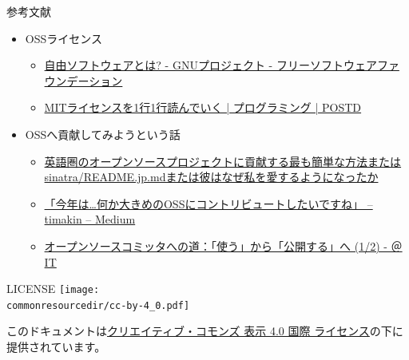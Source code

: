 \documentclass[
        unicode%
    ]{beamer}
\newcommand*\commonresourcedir{../../resources}
\begin{document}
\begin{frame}{参考文献}
    \begin{itemize}
        \item OSSライセンス
            \begin{itemize}
                \item \href{https://www.gnu.org/philosophy/free-sw.ja.html}{自由ソフトウェアとは? - GNUプロジェクト - フリーソフトウェアファウンデーション}
                \item \href{http://postd.cc/mit-license-line-by-line/}{MITライセンスを1行1行読んでいく | プログラミング | POSTD}
            \end{itemize}
        \item OSSへ貢献してみようという話
            \begin{itemize}
                \item \href{https://melborne.github.io/2014/01/23/contribute-to-english-based-opensource-project-or-sinatra-japanese-readme/}{英語圏のオープンソースプロジェクトに貢献する最も簡単な方法またはsinatra/README.jp.mdまたは彼はなぜ私を愛するようになったか}
                \item \href{https://medium.com/@timakin/\%E4\%BB\%8A\%E5\%B9\%B4\%E3\%81\%AF-\%E4\%BD\%95\%E3\%81\%8B\%E5\%A4\%A7\%E3\%81\%8D\%E3\%82\%81\%E3\%81\%AEoss\%E3\%81\%AB\%E3\%82\%B3\%E3\%83\%B3\%E3\%83\%88\%E3\%83\%AA\%E3\%83\%93\%E3\%83\%A5\%E3\%83\%BC\%E3\%83\%88\%E3\%81\%97\%E3\%81\%9F\%E3\%81\%84\%E3\%81\%A7\%E3\%81\%99\%E3\%81\%AD-902771f0ba0e}{「今年は…何か大きめのOSSにコントリビュートしたいですね」 – timakin – Medium}
                \item \href{http://www.atmarkit.co.jp/ait/articles/1211/28/news006.html}{オープンソースコミッタへの道：「使う」から「公開する」へ (1/2) - ＠IT}
            \end{itemize}
    \end{itemize}
\end{frame}

\begin{frame}{LICENSE}
    \phantom{}
    {
        \centering
        \texttt{[image: \\commonresourcedir/cc-by-4\_0.pdf]}\\
    }

    \vspace*{\baselineskip}
    このドキュメントは\href{http://creativecommons.org/licenses/by/4.0/}{クリエイティブ・コモンズ 表示 4.0 国際 ライセンス}の下に提供されています。
\end{frame}
\end{document}
